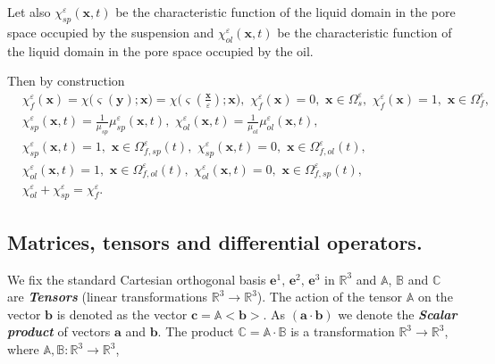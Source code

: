 \documentclass{article}
\theoremstyle{plain}
\theoremstyle{definition}
\numberwithin{equation}{section}
\begin{document}
Let also $\chi^{\varepsilon}_{sp}(\boldsymbol{x},t)$ be the characteristic function of the liquid domain in the pore space occupied by the suspension and $\chi^{\varepsilon}_{ol}(\boldsymbol{x},t)$ be the characteristic function of the liquid domain in the pore space occupied by the oil.

Then by construction
\begin{equation}\label{eq.2.2}
\begin{aligned}
&
\chi^{\varepsilon}_{f}(\boldsymbol{x})=\chi\big(\boldsymbol{\varsigma}(\boldsymbol{y});
\boldsymbol{x}\big)=\chi\big(\boldsymbol{\varsigma}(\frac{\boldsymbol{x}}{\varepsilon});
\boldsymbol{x}),\,\,\chi^{\varepsilon}_{f}(\boldsymbol{x})=0,\,\,
\boldsymbol{x}\in\Omega^{\varepsilon}_{s},\,\,\chi^{\varepsilon}_{f}(\boldsymbol{x})=1,\,\,
\boldsymbol{x}\in\Omega^{\varepsilon}_{f},
\\
& \chi^{\varepsilon}_{sp}(\boldsymbol{x},t)=
\frac{1}{\mu_{sp}}\mu^{\varepsilon}_{sp}(\boldsymbol{x},t),\,\,
\chi^{\varepsilon}_{ol}(\boldsymbol{x},t)=
\frac{1}{\mu_{ol}}\mu^{\varepsilon}_{ol}(\boldsymbol{x},t),
\\
& \chi^{\varepsilon}_{sp}(\boldsymbol{x},t)=1,\,\,\boldsymbol{x}\in\Omega^{\varepsilon}_{f,sp}(t),\,\,
\chi^{\varepsilon}_{sp}(\boldsymbol{x},t)=0,\,\,\boldsymbol{x}\in\Omega^{\varepsilon}_{f,ol}(t),
\\
& \chi^{\varepsilon}_{ol}(\boldsymbol{x},t)=1,\,\,\boldsymbol{x}\in\Omega^{\varepsilon}_{f,ol}(t),\,\,
\chi^{\varepsilon}_{ol}(\boldsymbol{x},t)=0,\,\,\boldsymbol{x}\in\Omega^{\varepsilon}_{f,sp}(t),
\\
& \chi^{\varepsilon}_{ol}+\chi^{\varepsilon}_{sp}=\chi^{\varepsilon}_{f}.
\end{aligned}
\end{equation}

\subsection{Matrices, tensors and differential operators.}

We fix the standard Cartesian orthogonal basis
$\boldsymbol{e}^{1},\,\boldsymbol{e}^{2},\,\boldsymbol{e}^{3}$
in $\mathbb{R}^{3}$ and $\mathbb{A}$, $\mathbb{B}$ and $\mathbb{C}$ are \textbf{\emph{Tensors}} (linear transformations $\mathbb{R}^{3}\rightarrow\mathbb{R}^{3}$).
The action of the tensor $\mathbb{A}$ on the vector $\boldsymbol{b}$
is denoted as the vector $\boldsymbol{c}=\mathbb{A}<\boldsymbol{b}>$. As $(\boldsymbol{a}\cdot\boldsymbol{b})$ we denote the \textbf{\emph{Scalar product}} of vectors $\boldsymbol{a}$ and $\boldsymbol{b}$.
The product $\mathbb{C}=\mathbb{A}\cdot\mathbb{B}$ is a transformation
$\mathbb{R}^{3}\rightarrow\mathbb{R}^{3}$, where $\mathbb{A}, \mathbb{B}:\mathbb{R}^{3}\rightarrow\mathbb{R}^{3}$, 
\end{document}
